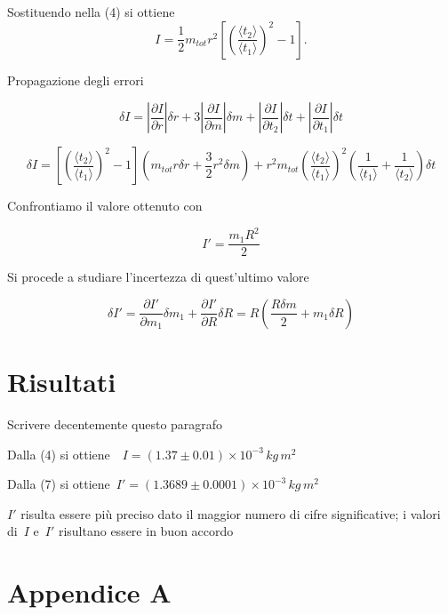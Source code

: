 \documentclass[10pt,a4paper]{article}
\begin{document}
Sostituendo nella (4) si ottiene\[I=\frac{1}{2}m_{tot} r^2\left[\left(\frac{\langle{t_2}\rangle}{\langle{t_1}\rangle}\right)^2-1\right].\]

Propagazione degli errori

\[\delta I = \left | \frac{\partial I}{\partial r} \right |\delta r + 3 \left | \frac{\partial I}{\partial m} \right | \delta m + \left | \frac{\partial I}{\partial t_2} \right | \delta t + \left | \frac{\partial I}{\partial t_1} \right |\delta t\]

\[\delta I = \left [ \left ( \frac{\langle t_2 \rangle}{\langle t_1 \rangle} \right) ^2 -1 \right] \left (m_{tot} r \delta r + \frac{3}{2} r^2 \delta m \right) + r^2 m_{tot} \left ( \frac{\langle t_2 \rangle}{\langle t_1 \rangle} \right) ^2 \left ( \frac{1}{\langle t_1 \rangle} +  \frac{1}{\langle t_2 \rangle} \right) \delta t\]

Confrontiamo il valore ottenuto con~

\[I'=\frac{m_1R^2}{2}\]

Si procede a studiare l'incertezza di quest'ultimo valore

\[\delta I' = \frac{\partial I'}{\partial m_1} \delta m_1 + \frac{\partial I'}{\partial R} \delta R=R \left ( \frac{R \delta m}{2} + m_1 \delta R \right )\]

\section*{Risultati}

{\label{420816}}

Scrivere decentemente questo paragrafo

Dalla (4) si ottiene~~\(I=(1.37 \pm 0.01) \times 10^{-3}\,kg\,m^2\)

Dalla (7) si ottiene~\(I'=(1.3689 \pm 0.0001) \times 10^{-3} \,kg\,m^2\)

\(I'\) risulta essere più preciso dato il maggior numero di
cifre significative; i valori di~\(I\)
e~\(I'\) risultano essere in buon accordo

\section*{Appendice A}

{\label{501222}}
\end{document}
